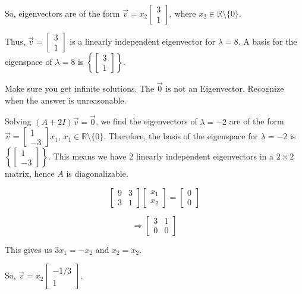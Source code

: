 \documentclass{article}
\begin{document}
So, eigenvectors are of the form \( \vec{v} = x_2 \begin{bmatrix} 3 \\ 1 \end{bmatrix} \), where \( x_2 \in \mathbb{R} \setminus \{0\} \).

Thus, \( \vec{v} = \begin{bmatrix} 3 \\ 1 \end{bmatrix} \) is a linearly independent eigenvector for \( \lambda = 8 \). A basis for the eigenspace of \( \lambda = 8 \) is \( \left\{ \begin{bmatrix} 3 \\ 1 \end{bmatrix} \right\} \).


Make sure you get infinite solutions. The $\vec{0}$ is not an Eigenvector. Recognize when the answer is unreasonable.

Solving \( (A+2I)\vec{v} = \vec{0} \), we find the eigenvectors of \( \lambda = -2 \) are of the form \( \vec{v} = \begin{bmatrix} 1 \\ -3 \end{bmatrix} x_1 \), \( x_1 \in \mathbb{R} \setminus \{0\} \). Therefore, the basis of the eigenspace for \( \lambda = -2 \) is \( \left\{ \begin{bmatrix} 1 \\ -3 \end{bmatrix} \right\} \). This means we have 2 linearly independent eigenvectors in a \( 2 \times 2 \) matrix, hence \( A \) is diagonalizable.

\[ \begin{bmatrix} 9 & 3 \\ 3 & 1 \end{bmatrix} \begin{bmatrix} x_1 \\ x_2 \end{bmatrix} = \begin{bmatrix} 0 \\ 0 \end{bmatrix} \]

\[ \Rightarrow \begin{bmatrix} 3 & 1 \\ 0 & 0 \end{bmatrix} \]

This gives us \( 3x_1 = -x_2 \) and \( x_2 = x_2 \).

So, \( \vec{v} = x_2 \begin{bmatrix} -1/3 \\ 1 \end{bmatrix} \).
\end{document}
